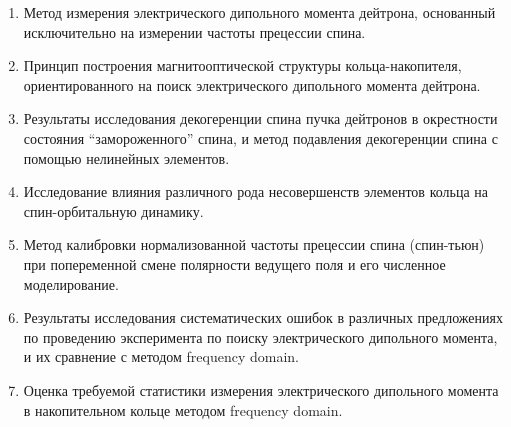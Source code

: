 {}
\begin{enumerate}
	\item Метод измерения электрического дипольного момента дейтрона, основанный исключительно на измерении частоты прецессии спина.
	\item Принцип построения магнитооптической структуры кольца-накопителя, ориентированного на поиск электрического дипольного момента дейтрона.
	\item Результаты исследования декогеренции спина пучка дейтронов в окрестности состояния ``замороженного'' спина, и метод подавления декогеренции спина с помощью нелинейных элементов.
	\item Исследование влияния различного рода несовершенств элементов кольца на спин-орбитальную динамику. 
	\item Метод калибровки нормализованной частоты прецессии спина (спин-тьюн) при попеременной смене полярности ведущего поля и его численное моделирование.
	\item Результаты исследования систематических ошибок в различных предложениях по проведению эксперимента по поиску электрического дипольного момента, и их сравнение с методом frequency domain. 
	\item Оценка требуемой статистики измерения электрического дипольного момента в накопительном кольце методом frequency domain.
\end{enumerate}

